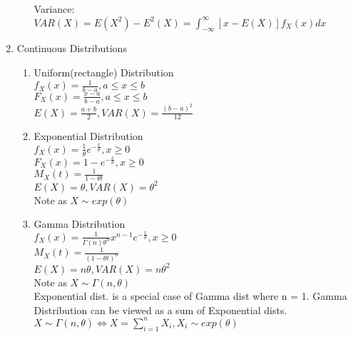 \documentclass[10pt]{article}
\begin{document}
\begin{multicols}{2}
\begin{enumerate}
\begin{enumerate}
				Variance: \\
				$VAR(X) = E(X^2) - E^2(X) = \int_{-\infty}^{\infty}[x-E(X)]f_X(x)dx$
			\end{enumerate}
			\item Continuous Distributions
			\begin{enumerate}
				\item Uniform(rectangle) Distribution\\
				$f_X(x) = \frac{1}{b-a}, a \le x \le b$\\
				$F_X(x) = \frac{x-a}{b-a}, a\le x \le b$\\
				$E(X) = \frac{a+b}{2}, VAR(X) = \frac{(b-a)^2}{12}$
				\item Exponential Distribution\\
				$f_X(x) = \frac{1}{\theta}e^{-\frac{x}{\theta}}, x \ge 0$\\
				$F_X(x) = 1- e^{-\frac{x}{\theta}}, x \ge 0$\\
				$M_X(t) = \frac{1}{1-\theta t}$\\
				$E(X) = \theta, VAR(X) = \theta^2$\\
				Note as $X \sim exp(\theta)$
				\item Gamma Distribution\\
				$f_X(x)= \frac{1}{\Gamma(n)\theta^n}x^{n-1}e^{-\frac{x}{\theta}}, x \ge 0$\\
				$M_X(t) = \frac{1}{(1-\theta t)^n}$\\
				$E(X) = n\theta, VAR(X) = n\theta^2$\\
				Note as $X \sim \Gamma(n,\theta)$\\
				Exponential dist. is a special case of Gamma dist where n = 1. Gamma Distribution can be viewed as a sum of Exponential dists.\\
				$X \sim \Gamma(n,\theta) \Leftrightarrow X = \sum_{i = 1}^{n} X_i, X_i \sim exp(\theta)$
			\end{enumerate}
		\end{enumerate}
	\newpage
	\end{multicols}
\end{document}

